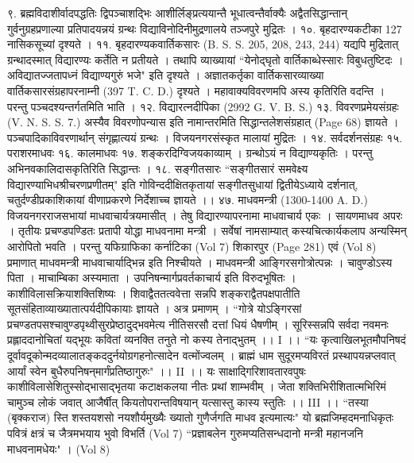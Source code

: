 ९. ब्रह्मविदाशीर्वादपद्धतिः
द्विपञ्चाशद्भिः आशीर्लिङ्प्रत्ययान्तै भूधात्वन्तैर्वाक्यैः अद्वैतसिद्धान्तान् गुर्वनुग्रहप्रणाल्या प्रतिपादयन्नयं ग्रन्थः विद्याविनोदिनीमुद्रणालये तञ्जपुरे मुद्रितः ।
१०. बृहदारण्यकटीका 127 नासिकसूच्यां दृश्यते ।
११. बृहदारण्यकवार्तिकसारः (B. S. S. 205, 208, 243, 244)
यद्यपि मुद्रितात् ग्रन्थादस्मात् विद्यारण्यः कर्तेति न प्रतीयते । तथापि व्याख्यायां ``येनोद्घृतो वार्तिकाब्धेस्सारः विबुधतुष्टिदः । अविद्यातज्जतापध्नं विद्याण्यगुरुं भजे" इति दृश्यते । अज्ञातकर्तृका वार्तिकसारव्याख्या वार्तिकसारसंग्रहापरनाम्नी (397 T. C. D.) दृश्यते । महावाक्यविवरणमपि अस्य कृतिरिति वदन्ति । परन्तु पञ्चदश्यन्तर्गतमिति भाति ।
१२. विद्यारत्नदीपिका (2992 G. V. B. S.)
१३. विवरणप्रमेयसंग्रहः (V. N. S. S. 7.)
अस्यैव विवरणोपन्यास इति नामान्तरमिति सिद्धान्तलेशसंग्रहात् (Page 68) ज्ञायते । पञ्चपादिकाविवरणार्थान् संगृह्णात्ययं ग्रन्थः । विजयनगरसंस्कृत मालायां मुद्रितः ।
१४. सर्वदर्शनसंग्रहः १५. पराशरमाधवः १६. कालमाधवः १७. शङ्करदिग्विजयकाव्याम् । ग्रन्थोऽयं न विद्याण्यकृतिः । परन्तु अभिनवकालिदासकृतिरिति सिद्धान्तः ।
१८. सङ्गीतसारः
``सङ्गीतसारं समवेक्ष्य विद्यारण्याभिधश्रीचरणप्रणीतम्" इति गोविन्ददीक्षितकृतायां सङ्गीतसुधायां द्वितीयेऽध्याये दर्शनात्, चतुर्दण्डीप्रकाशिकायां वीणाप्रकरणे निर्देशाच्च ज्ञायते ।।
४७. माधवमन्त्री (1300-1400 A. D.)
विजयनगरराजसभायां माधवाचार्यत्रयमासीत् । तेषु विद्यारण्यापरनामा माधवाचार्य एकः । सायणमाधव अपरः । तृतीयः प्रचण्डपण्डितः प्रतापी योद्धा माधवनामा मन्त्री । सर्वेषां नामसाम्यात् कस्यचित्कार्यकलाप अन्यस्मिन् आरोपितो भवति । परन्तु यफिग्राफिका कर्नाटिका (Vol 7) शिकारपुर (Page 281) एवं (Vol 8) प्रमाणात् माधवमन्त्री माधवाचार्याद्भिन्न इति निश्चीयते ।
माधवमन्त्री आङ्गिरसगोत्रोत्पन्नः । चावुण्डोऽस्य पिता । माचाम्बिका अस्यमाता । उपनिषन्मार्गप्रवर्तकाचार्य इति विरुदभूषितः । काशीविलासक्रियाशक्तिशिष्यः । शिवाद्वैततत्ववेत्ता सन्नपि शङ्कराद्वैतपक्षपातीति सूतसंहिताव्याख्यातात्पर्यदीपिकायाः ज्ञायते । अत्र प्रमाणम्  ।  ``गोत्रे योऽङ्गिरसां प्रचण्डतपसश्चावुण्डपृथ्वीसुरप्रेष्ठादुद्भवमेत्य नीतिसरसौ दत्तां धियं धैषणीम् । सूरिस्सन्नपि सर्वदा नवमनः प्रह्लाददानोचितां यद्भूयः कवितां व्यनक्ति तनुते नो कस्य तेनाद्भुतम् ।। I ।। ``यः कृत्वाखिलभूतमौपनिषदं दूर्वावदूकोन्मदव्यालातङ्कददुर्नयोग्रगहनोत्सादेन वत्मोंज्वलम् । ब्राह्मं धाम सुदूरमप्यविरतं प्रस्थापयन्नप्लवात् आर्यां स्वेन बुधैरुपनिषन्‌मार्गंप्रतिष्ठागुरुः" ।। II ।। यः साक्षाद्गिरिशावतारवपुषः काशीविलासेशितुस्सोद्भासाद्भृतया कटाक्षकलया नीतः प्रथां शाम्भवीम् । जेता शक्तिभिरीशितात्मभिरिमं चामुञ्च लोकं जवात् आजैर्षीत् कियतोपरान्तविषयान् यत्सास्तु कास्य स्तुतिः ।। III ।। ``तस्या (बृक्कराज) स्ति शस्तयशसो नयशौर्यमुख्यैः ख्यातो गुणैर्जगति माधव इत्यमात्यः" यो ब्रह्मजिम्हदमनाधिकृतः पवित्रं क्षत्रं च जैत्रमभयाय भुवो विभर्ति (Vol 7) ``प्रज्ञाबलेन गुरुमप्यतिसन्धदानो मन्त्री महानजनि माधवनामधेयः" । (Vol 8)
